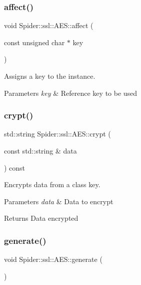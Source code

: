 \subsubsection{\texorpdfstring{affect()}{affect()}}
{\footnotesize\ttfamily void Spider\+::ssl\+::\+A\+E\+S\+::affect (\begin{DoxyParamCaption}\item[{const unsigned char $\ast$}]{key }\end{DoxyParamCaption})\hspace{0.3cm}{\ttfamily [inline]}}



Assigns a key to the instance. 


\begin{DoxyParams}{Parameters}
{\em key} & Reference key to be used \\
\hline
\end{DoxyParams}
\mbox{\label{class_spider_1_1ssl_1_1_a_e_s_a035de929280e43fed57eb5bbadab394f}} 
\subsubsection{\texorpdfstring{crypt()}{crypt()}}
{\footnotesize\ttfamily std\+::string Spider\+::ssl\+::\+A\+E\+S\+::crypt (\begin{DoxyParamCaption}\item[{const std\+::string \&}]{data }\end{DoxyParamCaption}) const}



Encrypts data from a class key. 


\begin{DoxyParams}{Parameters}
{\em data} & Data to encrypt \\
\hline
\end{DoxyParams}
\begin{DoxyReturn}{Returns}
Data encrypted 
\end{DoxyReturn}
\mbox{\label{class_spider_1_1ssl_1_1_a_e_s_a3cba36653117622e01fedfafa9fb1c6a}} 
\subsubsection{\texorpdfstring{generate()}{generate()}}
{\footnotesize\ttfamily void Spider\+::ssl\+::\+A\+E\+S\+::generate (\begin{DoxyParamCaption}{ }\end{DoxyParamCaption})\hspace{0.3cm}{\ttfamily [inline]}}



